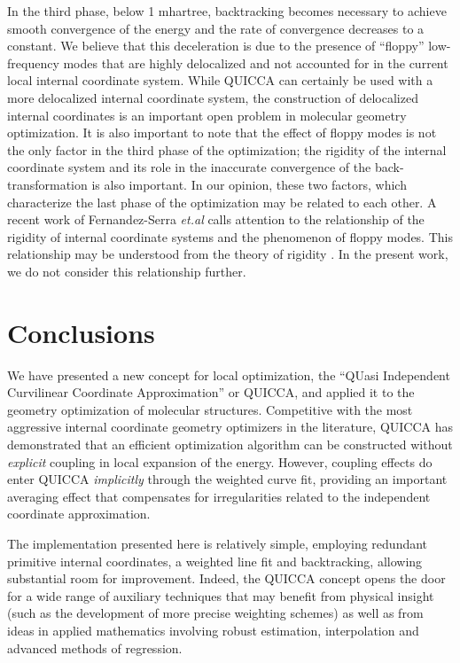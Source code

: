 \documentclass[prl,twocolumn,showpacs,twocolumngrid,superbib]{revtex4}
\begin{document}
In the third phase, below 1 mhartree, backtracking becomes necessary to achieve smooth 
convergence of the energy and the rate of convergence decreases to a constant.  We believe
that this deceleration is due to the presence of ``floppy'' low-frequency modes
that are highly delocalized and not accounted for in the current local internal 
coordinate system.  While QUICCA can certainly be used with a more delocalized 
internal coordinate system, the construction of delocalized internal coordinates 
is an important open problem in molecular geometry optimization.   It is also important to note that 
the effect of floppy modes is not the only factor in the third phase of the optimization; the rigidity 
of the internal coordinate system and its role in the inaccurate convergence of the back-transformation 
is also important. In our opinion, these two factors, which characterize the last phase of the 
optimization may be related to each other.  A recent work of Fernandez-Serra {\it et.al} \cite{Serra03} 
calls attention to the relationship of the rigidity of internal coordinate systems and the 
phenomenon of floppy modes. This relationship may be understood from the theory of 
rigidity \cite{Phillips85}. In the present work, we do not 
consider this relationship further.

\section{Conclusions}

We have presented a new concept for local optimization, the ``QUasi Independent Curvilinear 
Coordinate Approximation'' or  QUICCA, and applied it to the geometry optimization of molecular 
structures. Competitive with the most aggressive internal coordinate geometry optimizers in the literature, 
QUICCA has demonstrated that an efficient optimization algorithm can be constructed without 
{\em explicit} coupling in local expansion of the energy.  However, coupling effects do enter 
QUICCA {\em implicitly} through the weighted curve fit, providing an important averaging effect that 
compensates for irregularities related to the independent coordinate approximation.  

The implementation presented here is relatively simple, employing redundant primitive 
internal coordinates, a weighted line fit and backtracking, allowing  substantial room for 
improvement.  Indeed, the QUICCA concept opens the door for a wide range of auxiliary techniques 
that may benefit from physical insight (such as the development of more precise weighting schemes) 
as well as from ideas in applied mathematics involving robust estimation, interpolation and 
advanced methods of regression.  
\end{document}

